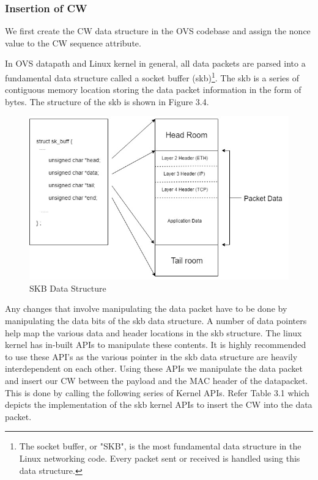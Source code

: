\subsubsection{Insertion of CW}
We first create the CW data structure in the OVS codebase and assign the nonce value to the CW sequence attribute. 


In OVS datapath and Linux kernel in general, all data packets are parsed into a fundamental data structure called a socket buffer (skb)\footnote{The socket buffer, or "SKB", is the most fundamental data structure in the Linux networking code. Every packet sent or received is handled using this data structure.}. The skb is a series of contiguous memory location storing the data packet information in the form of bytes. The structure of the skb is shown in Figure 3.4.

\begin{figure}[H]
       \centering\includegraphics[width=\textwidth]{images/13_SKB_Data_Structure.jpg}
       \caption{SKB Data Structure}
       \label{fig:compbest}
\end{figure}

Any changes that involve manipulating the data packet have to be done by manipulating the data bits of the skb data structure. A number of data pointers help map the various data and header locations in the skb structure. The linux kernel has in-built APIs to manipulate these contents. It is highly recommended to use these API's as the various pointer in the skb data structure are heavily interdependent on each other. Using these APIs we manipulate the data packet and insert our CW between the payload and the MAC header of the datapacket. This is done by calling the following series of Kernel APIs. Refer Table 3.1 which depicts the implementation of the skb kernel APIs to insert the CW into the data packet.\\

